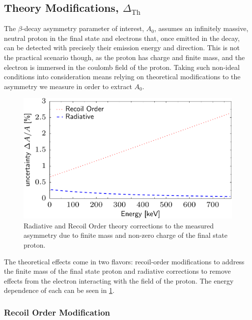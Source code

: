 \subsection{Theory Modifications, $\Delta_{\mathrm{Th}}$} \label{ssec:deltaTh}

The $\beta$-decay asymmetry parameter of interest, $A_0$, assumes an infinitely massive,
neutral proton in the final state and electrons that, once emitted in the decay, can be
detected with precisely their emission energy and direction. This is not the practical scenario
though, as the proton has charge and finite mass, and the electron is immersed in the coulomb
field of the proton. Taking such non-ideal conditions into consideration means relying on
theoretical modifications to the asymmetry we measure in order to extract $A_0$.
\begin{figure}[h]
  \centering
  \includegraphics[scale=0.7]{5-UCNAResults/TheoryUncert2011.pdf} 
  \caption{Radiative and Recoil Order theory corrections to the measured asymmetry
  due to finite mass and non-zero charge of the final state proton.}
  \label{fig:theoryCorr}
\end{figure}

The theoretical effects come in two flavors: recoil-order modifications to address the finite
mass of the final state proton and radiative corrections to remove effects from the electron
interacting with the field of the proton. The energy dependence of each
can be seen in \ref{fig:theoryCorr}.

\subsubsection{Recoil Order Modification}

